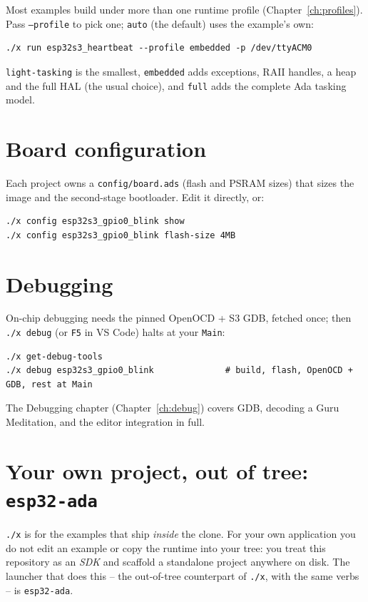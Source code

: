 Most examples build under more than one runtime profile (Chapter~\ref{ch:profiles}).
Pass \texttt{--profile} to pick one; \texttt{auto} (the default) uses the
example's own:

\begin{lstlisting}[style=sh]
./x run esp32s3_heartbeat --profile embedded -p /dev/ttyACM0
\end{lstlisting}

\texttt{light-tasking} is the smallest, \texttt{embedded} adds exceptions, RAII
handles, a heap and the full HAL (the usual choice), and \texttt{full} adds the
complete Ada tasking model.

\section{Board configuration}

Each project owns a \texttt{config/board.ads} (flash and PSRAM sizes) that sizes
the image and the second-stage bootloader. Edit it directly, or:

\begin{lstlisting}[style=sh]
./x config esp32s3_gpio0_blink show
./x config esp32s3_gpio0_blink flash-size 4MB
\end{lstlisting}

\section{Debugging}

On-chip debugging needs the pinned OpenOCD + S3 GDB, fetched once; then
\texttt{./x debug} (or \texttt{F5} in VS Code) halts at your \texttt{Main}:

\begin{lstlisting}[style=sh]
./x get-debug-tools
./x debug esp32s3_gpio0_blink              # build, flash, OpenOCD + GDB, rest at Main
\end{lstlisting}

The Debugging chapter (Chapter~\ref{ch:debug}) covers GDB, decoding a Guru
Meditation, and the editor integration in full.

\section{Your own project, out of tree: \texttt{esp32-ada}}
\label{sec:esp32-ada}

\texttt{./x} is for the examples that ship \emph{inside} the clone. For your own
application you do not edit an example or copy the runtime into your tree: you
treat this repository as an \emph{SDK} and scaffold a standalone project anywhere
on disk. The launcher that does this -- the out-of-tree counterpart of
\texttt{./x}, with the same verbs -- is \texttt{esp32-ada}.

